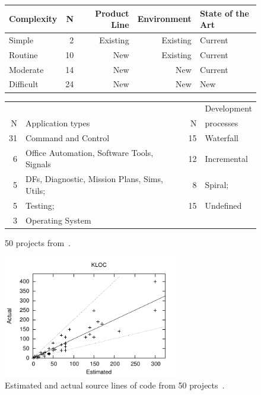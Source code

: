\documentclass[final,twocolumn]{elsarticle}
\theoremstyle{break}
\begin{document}
  
\begin{figure}[!t]
  \scriptsize
  \begin{center}
      \begin{tabular}{|p{0.6in}|r|r|r|p{0.6in}|}\hline
      Complexity & N &  Product Line  & Environment & State of the Art\\\hline
Simple& 2& Existing& Existing &Current\\
Routine& 10& New& Existing& Current\\
Moderate& 14& New& New& Current\\
Difficult& 24& New& New& New\\\hline
   \end{tabular}

      \vspace{4mm}
      
  \begin{tabular}{|rp{1.8in}|rl|}\hline
        & & &Development\\
     N   &Application  types &N & processes\\\hline
     31 &Command and Control & 15 &Waterfall\\
    6 &Office Automation, Software Tools, Signals & 12 &Incremental\\
    5 &DFs, Diagnostic, Mission Plans, Sims, Utils; &  8 &Spiral;\\
   5 &Testing; & 15 &Undefined\\\cline{3-4}
   3 &Operating System &\\\cline{1-2}
  \end{tabular}
  \end{center}
  \caption{50 projects from~\cite{jones07a}.}\label{fig:jones}
\end{figure}
\begin{figure}
\includegraphics[width=3in]{data.pdf}
\caption{Estimated and actual source lines of code from 50 projects~\cite{jones07a}.}\label{fig:ea}
\end{figure}
\end{document}

